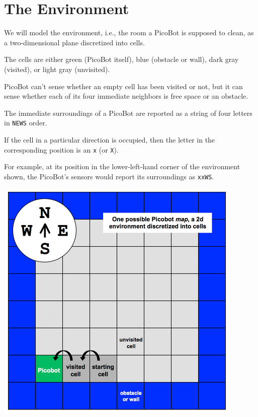 \documentclass[8pt,a4paper,compress,handout]{beamer}
\begin{document}
\section{The Environment}
\begin{frame}[fragile]
\begin{minipage}{200pt}
We will model the environment, i.e., the room a PicoBot is supposed to clean, as a two-dimensional plane discretized into cells.

\bigskip

The cells are either green (PicoBot itself), blue (obstacle or wall), dark gray (visited), or light gray (unvisited). 

\bigskip

PicoBot can't sense whether an empty cell has been visited or not, but it can sense whether each of its four immediate neighbors is free space or an obstacle.

\bigskip

The immediate surroundings of a PicoBot are reported as a string of four letters in \lstinline{NEWS} order.

\bigskip

If the cell in a particular direction is occupied, then the letter in the corresponding position is an \lstinline{x} (or \lstinline{X}). 

\bigskip

For example, at its position in the lower-left-hand corner of the environment shown, the PicoBot's sensors would report its surroundings as \lstinline{xxWS}.
\end{minipage}\hfill%
\begin{minipage}{100pt}
\begin{center}
\includegraphics[scale=0.25]{figures/picobot_env.png}


\end{center}
\end{minipage}
\end{frame}
\end{document}
